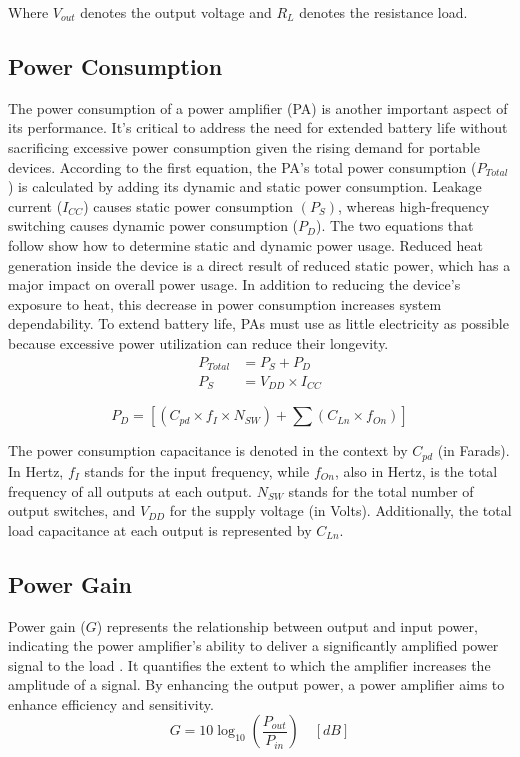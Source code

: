 Where $V_{out}$ denotes the output voltage and $R_L$ denotes the resistance load.
\subsection{Power Consumption}
The power consumption of a power amplifier (PA) is another important aspect of its performance. It's critical to address the need for extended battery life without sacrificing excessive power consumption given the rising demand for portable devices. According to the first equation, the PA's total power consumption ($P_{Total}$) is calculated by adding its dynamic and static power consumption. Leakage current ($I_{CC}$) causes static power consumption $(P_S)$, whereas high-frequency switching causes dynamic power consumption ($P_D$). The two equations that follow show how to determine static and dynamic power usage. Reduced heat generation inside the device is a direct result of reduced static power, which has a major impact on overall power usage. In addition to reducing the device's exposure to heat, this decrease in power consumption increases system dependability. To extend battery life, PAs must use as little electricity as possible because excessive power utilization can reduce their longevity.
\begin{align}
    P_{Total}&=P_S+P_D\\
    P_S&=V_{DD}\times I_{CC}
\end{align}

\begin{equation}
    P_D=\left[\left(C_{pd}\times f_I\times N_{SW}\right)+ \sum \left(C_{Ln}\times f_{On}\right) \right]
\end{equation}

The power consumption capacitance is denoted in the context by $C_{pd}$ (in Farads). In Hertz, $f_I$ stands for the input frequency, while $f_{On}$, also in Hertz, is the total frequency of all outputs at each output. $N_{SW}$ stands for the total number of output switches, and $V_{DD}$ for the supply voltage (in Volts). Additionally, the total load capacitance at each output is represented by $C_{Ln}$.

\subsection{Power Gain}
Power gain ($G$) represents the relationship between output and input power, indicating the power amplifier's ability to deliver a significantly amplified power signal to the load \cite{thirteenth}. It quantifies the extent to which the amplifier increases the amplitude of a signal. By enhancing the output power, a power amplifier aims to enhance efficiency and sensitivity.
\begin{equation}
    G=10\log_{10}\left(\frac{P_{out}}{P_{in}}\right) \quad [dB]
\end{equation}

